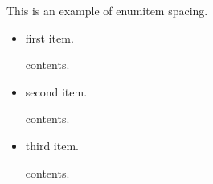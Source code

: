 \usepackage{enumitem}

This is an example of enumitem spacing.
\begin{itemize}[itemsep= 15 pt,topsep = 20 pt]
    \item first item.
    
    contents.
    \item second item.
    
    contents.
    \item third item.
    
    contents.
\end{itemize}
